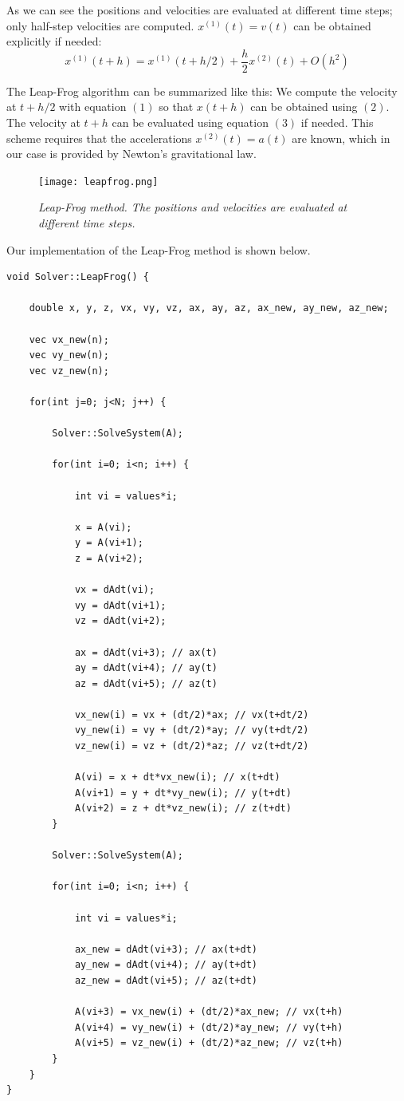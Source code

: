 \documentclass[a4paper,12pt, english]{article}
\begin{document}
As we can see the positions and velocities are evaluated at different time steps; only half-step velocities are computed. $x^{(1)}(t) = v(t)$ can be obtained explicitly if needed:
\[
x^{(1)}(t+h) = x^{(1)}(t+h/2) + \frac{h}{2}x^{(2)}(t) + O(h^2) \tag{3}
\]

The Leap-Frog algorithm can be summarized like this: We compute the velocity at $t+h/2$ with equation $(1)$ so that $x(t+h)$ can be obtained using $(2)$. The velocity at $t+h$ can be evaluated using equation $(3)$ if needed. This scheme requires that the accelerations $x^{(2)}(t) = a(t)$ are known, which in our case is provided by Newton's gravitational law.

\begin{figure}[H]
  \centering \texttt{[image: leapfrog.png]}
  \caption{\textit{Leap-Frog method. The positions and velocities are evaluated at different time steps.}}
\end{figure}

Our implementation of the Leap-Frog method is shown below.

 \begin{lstlisting}[title={Function Leap Frog}]
void Solver::LeapFrog() {

    double x, y, z, vx, vy, vz, ax, ay, az, ax_new, ay_new, az_new;

    vec vx_new(n);
    vec vy_new(n);
    vec vz_new(n);

    for(int j=0; j<N; j++) {

        Solver::SolveSystem(A);

        for(int i=0; i<n; i++) {

            int vi = values*i;

            x = A(vi);
            y = A(vi+1);
            z = A(vi+2);

            vx = dAdt(vi);
            vy = dAdt(vi+1);
            vz = dAdt(vi+2);

            ax = dAdt(vi+3); // ax(t)
            ay = dAdt(vi+4); // ay(t)
            az = dAdt(vi+5); // az(t)

            vx_new(i) = vx + (dt/2)*ax; // vx(t+dt/2)
            vy_new(i) = vy + (dt/2)*ay; // vy(t+dt/2)
            vz_new(i) = vz + (dt/2)*az; // vz(t+dt/2)

            A(vi) = x + dt*vx_new(i); // x(t+dt)
            A(vi+1) = y + dt*vy_new(i); // y(t+dt)
            A(vi+2) = z + dt*vz_new(i); // z(t+dt)
        }

        Solver::SolveSystem(A);

        for(int i=0; i<n; i++) {

            int vi = values*i;

            ax_new = dAdt(vi+3); // ax(t+dt)
            ay_new = dAdt(vi+4); // ay(t+dt)
            az_new = dAdt(vi+5); // az(t+dt)

            A(vi+3) = vx_new(i) + (dt/2)*ax_new; // vx(t+h)
            A(vi+4) = vy_new(i) + (dt/2)*ay_new; // vy(t+h)
            A(vi+5) = vz_new(i) + (dt/2)*az_new; // vz(t+h)
        }
    }
}
\end{lstlisting}
\end{document}

